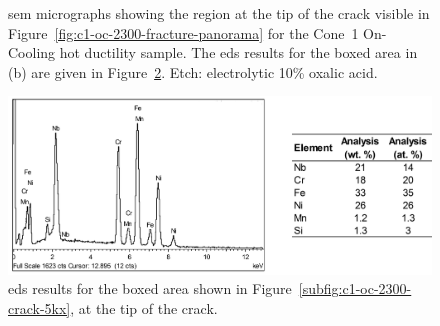 {\begin{figure}
    \caption[\Gls{sem} micrographs showing the region at the tip of the crack visible in Figure~\ref{fig:c1-oc-2300-fracture-panorama} for the Cone~1 On-Cooling \protect{} hot ductility sample.]{\Gls{sem} micrographs showing the region at the tip of the crack visible in Figure~\ref{fig:c1-oc-2300-fracture-panorama} for the Cone~1 On-Cooling \protect{} hot ductility sample. The \gls{eds} results for the boxed area in (b) are given in Figure~\ref{fig:c1-oc-2300-crack-tip-particles-eds}. Etch: electrolytic 10\% oxalic acid.}
    \label{fig:c1-oc-2300-crack-sem}
\end{figure}

\begin{figure}
    \centering
    \includegraphics[width=\textwidth]{figures/metallography/c1-oc-2300-crack-tip-particles-eds-table.png}
    \caption{\Gls{eds} results for the boxed area shown in Figure~\ref{subfig:c1-oc-2300-crack-5kx}, at the tip of the crack.}
    \label{fig:c1-oc-2300-crack-tip-particles-eds}
\end{figure}


}
